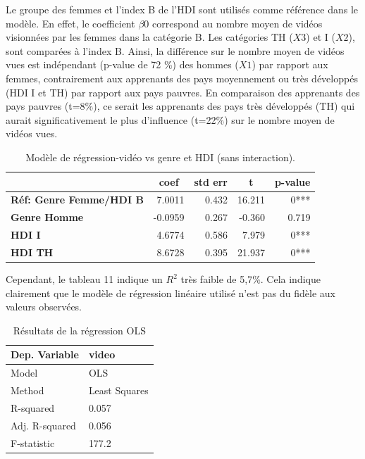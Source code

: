 \documentclass[12pt, a4paper, titlepage, table]{article}
\begin{document}
	Le groupe des femmes et l'index B de l'HDI sont utilisés comme référence dans le modèle.
	En effet, le coefficient $\beta0$ correspond au nombre moyen de vidéos visionnées par les femmes dans la catégorie B. 
	Les catégories TH ($X3$) et I ($X2$), sont comparées à l'index B.
	Ainsi, la différence sur le nombre moyen de vidéos vues est indépendant (p-value de 72 \%) des hommes ($X1$) par rapport aux femmes, contrairement aux apprenants des pays moyennement ou très développés (HDI I et TH) par rapport aux pays pauvres.
	En comparaison des apprenants des pays pauvres (t=8\%), ce serait les apprenants des pays très développés (TH) qui aurait significativement le plus d'influence (t=22\%) sur le nombre moyen de vidéos vues. 
	\begin{table}[H]
		\centering
		\fontsize{12}{20}\selectfont
		\begin{tabular}{|l|r|r|r|r|}
			\hline
			\multicolumn{1}{|c|}{\textbf{}}&
			\multicolumn{1}{c|}{\textbf{coef}}&
			\multicolumn{1}{c|}{\textbf{std err}}&
			\multicolumn{1}{c|}{\textbf{t}}&
			\multicolumn{1}{c|}{\textbf{p-value}}\\	
			\hline
			\textbf{Réf: Genre Femme/HDI B}&			7.0011&		0.432&	16.211&	0***\\	
			\textbf{Genre Homme}&	-0.0959&	0.267&	-0.360&	0.719\\
			\textbf{HDI I}&	4.6774&		0.586&	7.979&	0***\\
			\textbf{HDI TH}&	8.6728&		0.395&	21.937&	0***\\
			\hline
		\end{tabular}
		\caption{{Modèle de régression-vidéo vs genre et HDI (sans interaction).}}
	\end{table}	

	Cependant, le tableau 11 indique un $R^2$ très faible de 5,7\%. Cela indique clairement que le modèle de régression linéaire utilisé n'est pas
	du fidèle aux valeurs observées. 
	\begin{table}[H]
		\centering
		\begin{tabular}{@{}ll@{}}
		\toprule
		Dep. Variable & video \\
		\midrule
		Model         & OLS   \\
		Method        & Least Squares \\
		R-squared     & 0.057 \\
		Adj. R-squared& 0.056 \\
		F-statistic   & 177.2 \\
		\bottomrule
		\end{tabular}
		\caption{Résultats de la régression OLS}
	\end{table}
\end{document}
